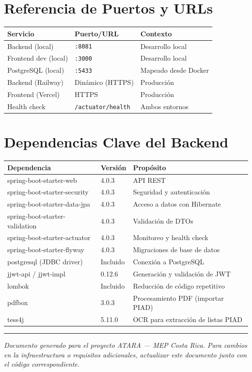\documentclass[11pt, a4paper]{article}
\begin{document}
\section{Referencia de Puertos y URLs}

\begin{center}
\begin{tabular}{L{5cm} L{3cm} L{5.5cm}}
\toprule
\textbf{Servicio} & \textbf{Puerto/URL} & \textbf{Contexto} \\
\midrule
Backend (local)         & \texttt{:8081}  & Desarrollo local \\
Frontend dev (local)    & \texttt{:3000}  & Desarrollo local \\
PostgreSQL (local)      & \texttt{:5433}  & Mapeado desde Docker \\
Backend (Railway)       & Dinámico (HTTPS) & Producción \\
Frontend (Vercel)       & HTTPS           & Producción \\
Health check            & \texttt{/actuator/health} & Ambos entornos \\
\bottomrule
\end{tabular}
\end{center}

\section{Dependencias Clave del Backend}

\begin{center}
\begin{tabular}{L{5.5cm} L{2.5cm} L{5.5cm}}
\toprule
\textbf{Dependencia} & \textbf{Versión} & \textbf{Propósito} \\
\midrule
spring-boot-starter-web       & 4.0.3  & API REST \\
spring-boot-starter-security  & 4.0.3  & Seguridad y autenticación \\
spring-boot-starter-data-jpa  & 4.0.3  & Acceso a datos con Hibernate \\
spring-boot-starter-validation & 4.0.3 & Validación de DTOs \\
spring-boot-starter-actuator  & 4.0.3  & Monitoreo y health check \\
spring-boot-starter-flyway    & 4.0.3  & Migraciones de base de datos \\
postgresql (JDBC driver)      & Incluido & Conexión a PostgreSQL \\
jjwt-api / jjwt-impl          & 0.12.6 & Generación y validación de JWT \\
lombok                        & Incluido & Reducción de código repetitivo \\
pdfbox                        & 3.0.3  & Procesamiento PDF (importar PIAD) \\
tess4j                        & 5.11.0 & OCR para extracción de listas PIAD \\
\bottomrule
\end{tabular}
\end{center}

\vspace{1cm}
\hrule
\vspace{0.4cm}
{\small\textit{Documento generado para el proyecto ATARA --- MEP Costa Rica. Para cambios en la infraestructura o requisitos adicionales, actualizar este documento junto con el código correspondiente.}}
\end{document}

